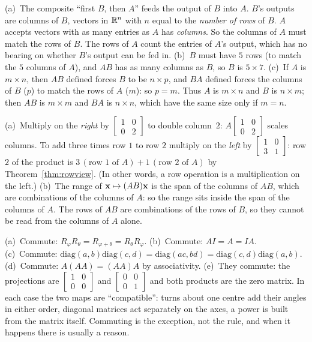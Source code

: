 \documentclass[11pt]{article}
\begin{document}
\begin{description}[leftmargin=0pt,itemsep=5pt]
  \item[Pause and think \ref{think:sizes}.] (a)~The composite ``first $B$, then $A$'' feeds the output of $B$ into $A$. $B$'s outputs are columns of $B$, vectors in $\mathbb{R}^n$ with $n$ equal to the \emph{number of rows} of $B$. $A$ accepts vectors with as many entries as $A$ has \emph{columns}. So the columns of $A$ must match the rows of $B$. The rows of $A$ count the entries of $A$'s output, which has no bearing on whether $B$'s output can be fed in. (b)~$B$ must have $5$ rows (to match the $5$ columns of $A$), and $AB$ has as many columns as $B$, so $B$ is $5\times7$. (c)~If $A$ is $m\times n$, then $AB$ defined forces $B$ to be $n\times p$, and $BA$ defined forces the columns of $B$ ($p$) to match the rows of $A$ ($m$): so $p=m$. Thus $A$ is $m\times n$ and $B$ is $n\times m$; then $AB$ is $m\times m$ and $BA$ is $n\times n$, which have the same size only if $m=n$.
  \item[Pause and think \ref{think:rowscols}.] (a)~Multiply on the \emph{right} by $\begin{bmatrix}1&0\\0&2\end{bmatrix}$ to double column~$2$: $A\begin{bmatrix}1&0\\0&2\end{bmatrix}$ scales columns. To add three times row $1$ to row $2$ multiply on the \emph{left} by $\begin{bmatrix}1&0\\3&1\end{bmatrix}$: row $2$ of the product is $3\,(\text{row }1\text{ of }A)+1\,(\text{row }2\text{ of }A)$ by Theorem~\ref{thm:rowview}. (In other words, a row operation is a multiplication on the left.) (b)~The range of $\mathbf{x}\mapsto(AB)\mathbf{x}$ is the span of the columns of $AB$, which are combinations of the columns of $A$: so the range sits inside the span of the columns of $A$. The rows of $AB$ are combinations of the rows of $B$, so they cannot be read from the columns of $A$ alone.
  \item[Pause and think \ref{think:commute}.] (a)~Commute: $R_\varphi R_\theta=R_{\varphi+\theta}=R_\theta R_\varphi$. (b)~Commute: $AI=A=IA$. (c)~Commute: $\mathrm{diag}(a,b)\mathrm{diag}(c,d)=\mathrm{diag}(ac,bd)=\mathrm{diag}(c,d)\mathrm{diag}(a,b)$. (d)~Commute: $A(AA)=(AA)A$ by associativity. (e)~They commute: the projections are $\begin{bmatrix}1&0\\0&0\end{bmatrix}$ and $\begin{bmatrix}0&0\\0&1\end{bmatrix}$ and both products are the zero matrix. In each case the two maps are ``compatible'': turns about one centre add their angles in either order, diagonal matrices act separately on the axes, a power is built from the matrix itself. Commuting is the exception, not the rule, and when it happens there is usually a reason.

\end{description}
\end{document}
